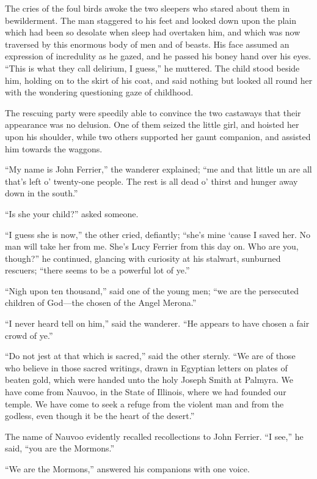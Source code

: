 \documentclass[12pt]{book}
\begin{document}
The cries of the foul birds awoke the two sleepers who stared about them in bewilderment. The man staggered to his feet and looked down upon the plain which had been so desolate when sleep had overtaken him, and which was now traversed by this enormous body of men and of beasts. His face assumed an expression of incredulity as he gazed, and he passed his boney hand over his eyes. “This is what they call delirium, I guess,” he muttered. The child stood beside him, holding on to the skirt of his coat, and said nothing but looked all round her with the wondering questioning gaze of childhood. 

The rescuing party were speedily able to convince the two castaways that their appearance was no delusion. One of them seized the little girl, and hoisted her upon his shoulder, while two others supported her gaunt companion, and assisted him towards the waggons. 

“My name is John Ferrier,” the wanderer explained; “me and that little un are all that’s left o’ twenty-one people. The rest is all dead o’ thirst and hunger away down in the south.” 

“Is she your child?” asked someone. 

“I guess she is now,” the other cried, defiantly; “she’s mine ‘cause I saved her. No man will take her from me. She’s Lucy Ferrier from this day on. Who are you, though?” he continued, glancing with curiosity at his stalwart, sunburned rescuers; “there seems to be a powerful lot of ye.” 

“Nigh upon ten thousand,” said one of the young men; “we are the persecuted children of God—the chosen of the Angel Merona.” 

“I never heard tell on him,” said the wanderer. “He appears to have chosen a fair crowd of ye.” 

“Do not jest at that which is sacred,” said the other sternly. “We are of those who believe in those sacred writings, drawn in Egyptian letters on plates of beaten gold, which were handed unto the holy Joseph Smith at Palmyra. We have come from Nauvoo, in the State of Illinois, where we had founded our temple. We have come to seek a refuge from the violent man and from the godless, even though it be the heart of the desert.” 

The name of Nauvoo evidently recalled recollections to John Ferrier. “I see,” he said, “you are the Mormons.” 

“We are the Mormons,” answered his companions with one voice. 
\end{document}
